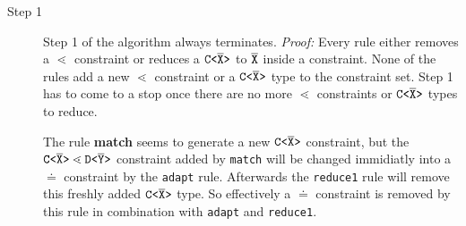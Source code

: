 \begin{description}
\item[Step 1] 
Step 1 of the algorithm always terminates. \textit{Proof:}
Every rule either removes a $\lessdot$ constraint or reduces a $\mathtt{C \texttt{<} \overline{\tt X} \texttt{>} }$ to $\overline{\tt X}$ inside a constraint.
None of the rules add a new $\lessdot$ constraint or a $\mathtt{C \texttt{<} \overline{\tt X} \texttt{>} }$ type to the constraint set.
Step 1 has to come to a stop once there are no more $\lessdot$ constraints or $\mathtt{C \texttt{<} \overline{\tt X} \texttt{>} }$ types to reduce.

The rule \textbf{match} seems to generate a new $\mathtt{C \texttt{<} \overline{\tt X} \texttt{>} }$ constraint,
but the $\mathtt{C \texttt{<} \overline{\tt X} \texttt{>} } \lessdot \mathtt{D \texttt{<} \overline{\tt Y} \texttt{>} }$ constraint added by \texttt{match}
will be changed immidiatly into a $\doteq$ constraint by the \texttt{adapt} rule.
Afterwards the \texttt{reduce1} rule will remove this freshly added $\mathtt{C \texttt{<} \overline{\tt X} \texttt{>} }$ type.
So effectively a $\doteq$ constraint is removed by this rule in combination with \texttt{adapt} and \texttt{reduce1}.


\end{description}
